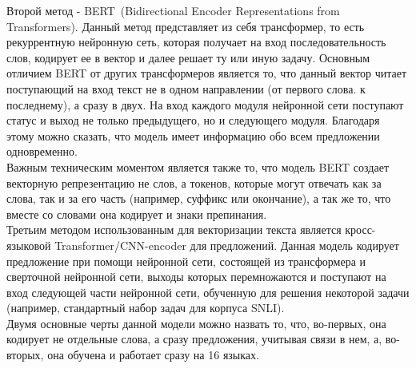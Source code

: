 \documentclass[a4paper,14pt]{article}
\begin{document}
\begin{justify}
\indent
Второй метод - BERT\ (Bidirectional Encoder Representations from Transformers). Данный метод представляет из себя трансформер, то есть рекуррентную нейронную сеть, которая получает на вход последовательность слов, кодирует ее в вектор и далее решает ту или иную задачу. Основным отличием BERT от других трансформеров является то, что данный вектор читает поступающий на вход текст не в одном направлении (от первого слова. к последнему), а сразу в двух. На вход каждого модуля нейронной сети поступают статус и выход не только предыдущего, но и следующего модуля. Благодаря этому можно сказать, что модель имеет информацию обо всем предложении одновременно. \cite{bert-init} \\
\indent
Важным техническим моментом является также то, что модель BERT создает векторную репрезентацию не слов, а токенов, которые могут отвечать как за слова, так и за его часть (например, суффикс или окончание), а так же то, что вместе со словами она кодирует и знаки препинания. \\
\indent
Третьим методом использованным для векторизации текста является кросс-языковой Transformer/CNN-encoder для предложений. Данная модель кодирует предложение при помощи нейронной сети, состоящей из трансформера и сверточной нейронной сети, выходы которых перемножаются и поступают на вход следующей части нейронной сети, обученную для решения некоторой задачи (например, стандартный набор задач для корпуса SNLI\cite{snli}). \\
\indent
Двумя основные черты данной модели можно назвать то, что, во-первых, она кодирует не отдельные слова, а сразу предложения, учитывая связи в нем, а, во-вторых, она обучена и работает сразу на 16 языках. \cite{tf-encoder} 
\end{justify}
\pagebreak
\end{document}
